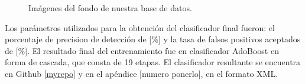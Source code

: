 \begin{figure}[h!]
\begin{center}
\quad 
{}\quad 
\end{center}
\caption{Imágenes del fondo de nuestra base de datos.}
\label{fig:ImagenFondo}
\end{figure}  

Los parámetros utilizados para la obtención del clasificador final fueron: el porcentaje de precision de detección de [$\%$] y la tasa de falsos positivos aceptados de [$\%$]. El resultado final del entrenamiento fue en clasificador AdoBoost en forma de cascada, que consta de 19 etapas. El clasificador resultante se encuentra en Github \ref{myrepo} y en el apéndice [numero ponerlo], en el formato XML.  


